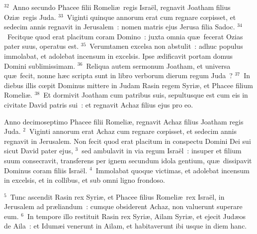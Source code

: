 ${}^{32}$~Anno secundo Phacee filii Romeli\ae\ regis Isra\"el, regnavit Joatham filius Ozi\ae\ regis Juda.
${}^{33}$~Viginti quinque annorum erat cum regnare cœpisset, et sedecim annis regnavit in Jerusalem~: nomen matris ejus Jerusa filia Sadoc.
${}^{34}$~Fecitque quod erat placitum coram Domino~: juxta omnia qu\ae\ fecerat Ozias pater suus, operatus est.
${}^{35}$~Verumtamen excelsa non abstulit~: adhuc populus immolabat, et adolebat incensum in excelsis. Ipse \ae dificavit portam domus Domini sublimissimam.
${}^{36}$~Reliqua autem sermonum Joatham, et universa qu\ae\ fecit, nonne h\ae c scripta sunt in libro verborum dierum regum Juda~?
${}^{37}$~In diebus illis cœpit Dominus mittere in Judam Rasin regem Syri\ae , et Phacee filium Romeli\ae .
${}^{38}$~Et dormivit Joatham cum patribus suis, sepultusque est cum eis in civitate David patris sui~: et regnavit Achaz filius ejus pro eo.

\lettrine[lines=10,image=true,loversize=0.05,lraise=-0.03]{A}{}nno decimoseptimo Phacee filii Romeli\ae , regnavit Achaz filius Joatham regis Juda.
${}^{2}$~Viginti annorum erat Achaz cum regnare cœpisset, et sedecim annis regnavit in Jerusalem. Non fecit quod erat placitum in conspectu Domini Dei sui sicut David pater ejus,
${}^{3}$~sed ambulavit in via regum Isra\"el~: insuper et filium suum consecravit, transferens per ignem secundum idola gentium, qu\ae\ dissipavit Dominus coram filiis Isra\"el.
${}^{4}$~Immolabat quoque victimas, et adolebat incensum in excelsis, et in collibus, et sub omni ligno frondoso.


${}^{5}$~Tunc ascendit Rasin rex Syri\ae , et Phacee filius Romeli\ae\ rex Isra\"el, in Jerusalem ad pr\ae liandum~: cumque obsiderent Achaz, non valuerunt superare eum.
${}^{6}$~In tempore illo restituit Rasin rex Syri\ae , Ailam Syri\ae , et ejecit Jud\ae os de Aila~: et Idum\ae i venerunt in Ailam, et habitaverunt ibi usque in diem hanc.


